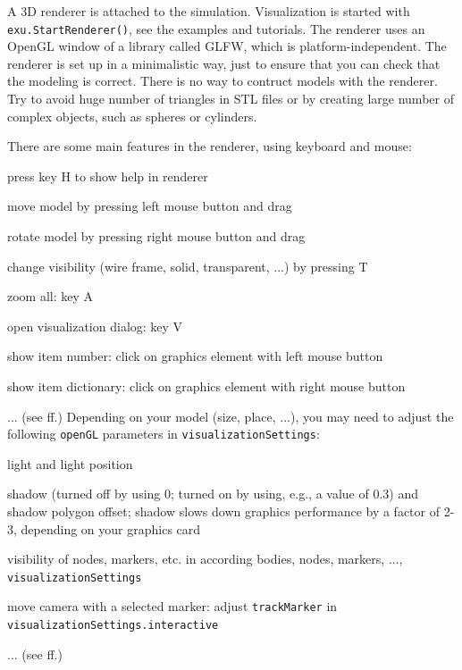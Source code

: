 A 3D renderer is attached to the simulation. Visualization is started with  \texttt{exu.StartRenderer()}, see the examples and tutorials.
The renderer uses an OpenGL window of a library called GLFW, which is platform-independent. 
The renderer is set up in a minimalistic way, just to ensure that you can check that the modeling is correct. There is no way to contruct models with the renderer. Try to avoid huge number of triangles in STL files or by creating large number of complex objects, such as spheres or cylinders.

\noindent There are some main features in the renderer, using keyboard and mouse:
\bi
  \item press key H to show help in renderer
  \item move model by pressing left mouse button and drag
  \item rotate model by pressing right mouse button and drag
  \item change visibility (wire frame, solid, transparent, ...) by pressing T
  \item zoom all: key A
  \item open visualization dialog: key V
  \item show item number: click on graphics element with left mouse button
  \item show item dictionary: click on graphics element with right mouse button  
  \item ... (see ff.)
\ei
%
Depending on your model (size, place, ...), you may need to adjust the following \texttt{openGL} parameters in \texttt{visualizationSettings}:
\bi
  \item light and light position 
  \item shadow (turned off by using 0; turned on by using, e.g., a value of 0.3) and shadow polygon offset; shadow slows down graphics performance by a factor of 2-3, depending on your graphics card
  \item visibility of nodes, markers, etc. in according bodies, nodes, markers, ..., \texttt{visualizationSettings}
  \item move camera with a selected marker: adjust \texttt{trackMarker} in \texttt{visualizationSettings.interactive}
  \item ... (see ff.)
\ei


